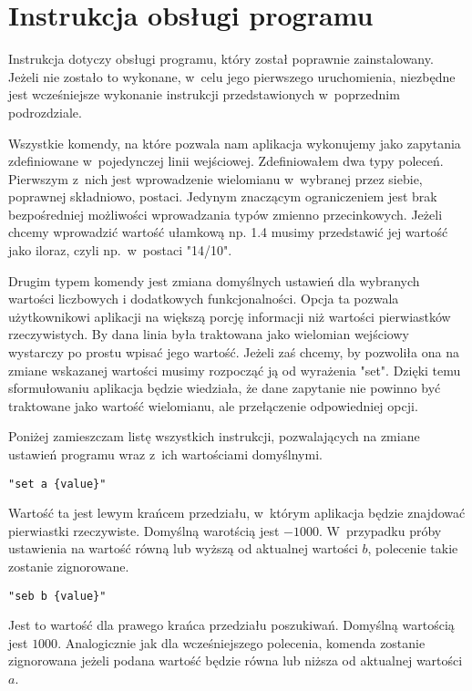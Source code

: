 \section{Instrukcja obsługi programu}

Instrukcja dotyczy obsługi programu, który został poprawnie zainstalowany. Jeżeli nie zostało to wykonane, w~celu jego pierwszego uruchomienia, niezbędne jest wcześniejsze wykonanie instrukcji przedstawionych w~poprzednim podrozdziale.

Wszystkie komendy, na które pozwala nam aplikacja wykonujemy jako zapytania zdefiniowane w~pojedynczej linii wejściowej. Zdefiniowałem dwa typy poleceń. Pierwszym z~nich jest wprowadzenie wielomianu w~wybranej przez siebie, poprawnej składniowo, postaci. Jedynym znaczącym ograniczeniem jest brak bezpośredniej możliwości wprowadzania typów zmienno przecinkowych. Jeżeli chcemy wprowadzić wartość ułamkową np. 1.4 musimy przedstawić jej wartość jako iloraz, czyli np.\ w~postaci "14/10".

Drugim typem komendy jest zmiana domyślnych ustawień dla wybranych wartości liczbowych i dodatkowych funkcjonalności. Opcja ta pozwala użytkownikowi aplikacji na większą porcję informacji niż wartości pierwiastków rzeczywistych. By dana linia była traktowana jako wielomian wejściowy wystarczy po prostu wpisać jego wartość. Jeżeli zaś chcemy, by pozwoliła ona na zmiane wskazanej wartości musimy rozpocząć ją od wyrażenia "set". Dzięki temu sformułowaniu aplikacja będzie wiedziała, że dane zapytanie nie powinno być traktowane jako wartość wielomianu, ale przełączenie odpowiedniej opcji.

Poniżej zamieszczam listę wszystkich instrukcji, pozwalających na zmiane ustawień programu wraz z~ich wartościami domyślnymi.

\begin{lstlisting}
"set a {value}"
\end{lstlisting}

Wartość ta jest lewym krańcem przedziału, w~którym aplikacja będzie znajdować pierwiastki rzeczywiste. Domyślną warotścią jest $-1000$. W~przypadku próby ustawienia na wartość równą lub wyższą od aktualnej wartości $b$, polecenie takie zostanie zignorowane.

\begin{lstlisting}
"seb b {value}"
\end{lstlisting}

Jest to wartość dla prawego krańca przedziału poszukiwań. Domyślną wartością jest $1000$. Analogicznie jak dla wcześniejszego polecenia, komenda zostanie zignorowana jeżeli podana wartość będzie równa lub niższa od aktualnej wartości $a$.


